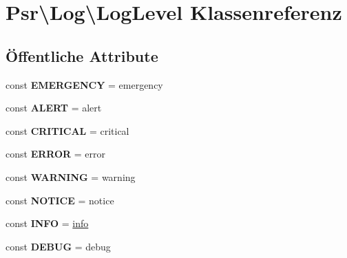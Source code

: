 \hypertarget{class_psr_1_1_log_1_1_log_level}{}\section{Psr\textbackslash{}Log\textbackslash{}Log\+Level Klassenreferenz}
\label{class_psr_1_1_log_1_1_log_level}
\subsection*{Öffentliche Attribute}
\begin{DoxyCompactItemize}
\item 
\mbox{\label{class_psr_1_1_log_1_1_log_level_ad5a687b8338a4cf11e210aa9ece69449}} 
const {\bfseries E\+M\+E\+R\+G\+E\+N\+CY} = \textquotesingle{}emergency\textquotesingle{}
\item 
\mbox{\label{class_psr_1_1_log_1_1_log_level_a2e0bdc8b5aa41180de42cd74a028ce49}} 
const {\bfseries A\+L\+E\+RT} = \textquotesingle{}alert\textquotesingle{}
\item 
\mbox{\label{class_psr_1_1_log_1_1_log_level_a305bb00d8c8985dd01aa2990c059e832}} 
const {\bfseries C\+R\+I\+T\+I\+C\+AL} = \textquotesingle{}critical\textquotesingle{}
\item 
\mbox{\label{class_psr_1_1_log_1_1_log_level_a478cdddf3ff43f5a9754ae08bfaf10df}} 
const {\bfseries E\+R\+R\+OR} = \textquotesingle{}error\textquotesingle{}
\item 
\mbox{\label{class_psr_1_1_log_1_1_log_level_ab1ce431780f2fd97b9701df443b778ea}} 
const {\bfseries W\+A\+R\+N\+I\+NG} = \textquotesingle{}warning\textquotesingle{}
\item 
\mbox{\label{class_psr_1_1_log_1_1_log_level_a5fa672e096a300872a1935c00bcec84d}} 
const {\bfseries N\+O\+T\+I\+CE} = \textquotesingle{}notice\textquotesingle{}
\item 
\mbox{\label{class_psr_1_1_log_1_1_log_level_ab949ec9949505e913454809b61d30ec7}} 
const {\bfseries I\+N\+FO} = \textquotesingle{}\mbox{\hyperlink{classinfo}{info}}\textquotesingle{}
\item 
\mbox{\label{class_psr_1_1_log_1_1_log_level_aca18adcee0782778483fca68f8a578f5}} 
const {\bfseries D\+E\+B\+UG} = \textquotesingle{}debug\textquotesingle{}
\end{DoxyCompactItemize}


